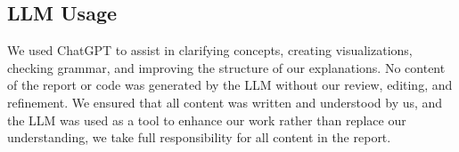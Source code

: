 \documentclass[10pt,letterpaper]{article}
\begin{document}
\subsection{LLM Usage}

We used ChatGPT to assist in clarifying concepts, creating visualizations, checking grammar, and improving the structure of our explanations. No content of the report or code was generated by the LLM without our review, editing, and refinement. We ensured that all content was written and understood by us, and the LLM was used as a tool to enhance our work rather than replace our understanding, we take full responsibility for all content in the report.
\end{document}
